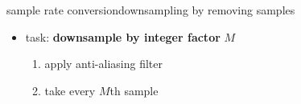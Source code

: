 	\begin{frame}{sample rate conversion}{downsampling by removing samples}
        \vspace{-3mm}
        \begin{itemize}
            \item   task: \textbf{downsample by integer factor} $M$
            \pause 
            \begin{enumerate}
                \item   apply anti-aliasing filter
                \item   take every $M$th sample
            \end{enumerate}
        \end{itemize}
    \end{frame}
